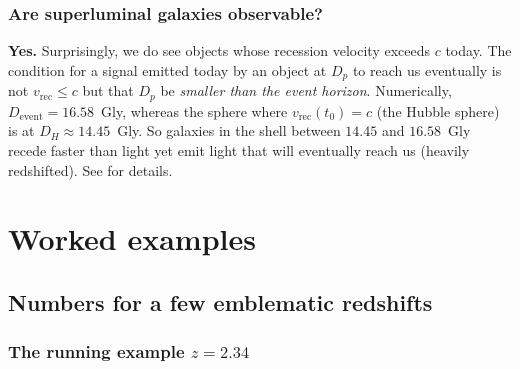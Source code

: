 \documentclass[11pt,a4paper,openany]{report}
\begin{document}
\section{Are superluminal galaxies observable?}

\textbf{Yes.} Surprisingly, we do see objects whose recession velocity exceeds
$c$ today. The condition for a signal emitted today by an object at $D_p$ to
reach us eventually is not $v_{\text{rec}} \le c$ but that $D_p$ be
\emph{smaller than the event horizon}. Numerically,
$D_{\text{event}} = 16.58$~Gly, whereas the sphere where
$v_{\text{rec}}(t_0) = c$ (the Hubble sphere) is at $D_H \approx 14.45$~Gly. So
galaxies in the shell between $14.45$ and $16.58$~Gly recede faster than light
yet emit light that will eventually reach us (heavily redshifted). See
\cite{Davis2004} for details.

\clearpage

\part{Worked examples}

\chapter{Numbers for a few emblematic redshifts}

\section{The running example \texorpdfstring{$z=2.34$}{z=2.34}}
\end{document}
